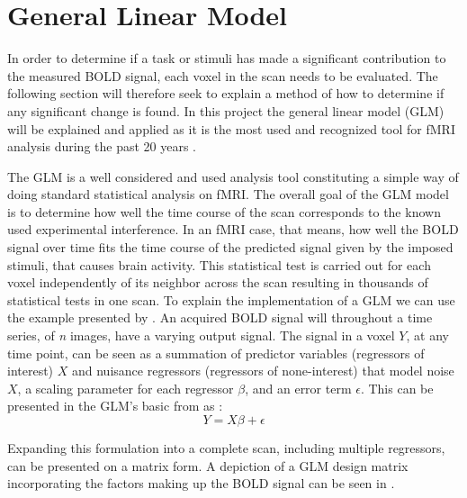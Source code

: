 \section{General Linear Model} \label{back:sec:glm}

In order to determine if a task or stimuli has made a significant contribution to the measured BOLD signal, each voxel in the scan needs to be evaluated. The following section will therefore seek to explain a method of how to determine if any significant change is found. In this project the general linear model (GLM) will be explained and applied as it is the most used and recognized tool for fMRI analysis during the past 20 years \cite{Poline2012}. 

The GLM is a well considered and used analysis tool constituting a simple way of doing standard statistical analysis on fMRI. The overall goal of the GLM model is to determine how well the time course of the scan corresponds to the known used experimental interference.  In an fMRI case, that means, how well the BOLD signal over time fits the time course of the predicted signal given by the imposed stimuli, that causes brain activity. This statistical test is carried out for each voxel independently of its neighbor across the scan resulting in thousands of statistical tests in one scan. \cite{Moayedi2018,Monti2011} To explain the implementation of a GLM we can use the example presented by \cite{Monti2011}. An acquired BOLD signal will throughout a time series, of \textit{n} images, have a varying output signal. The signal in a voxel $Y$, at any time point, can be seen as a summation of predictor variables (regressors of interest) $X$ and nuisance regressors (regressors of none-interest) that model noise $X$, a scaling parameter for each regressor $\beta$, and an error term $\epsilon$. This can be presented in the GLM's basic from as \cite{Monti2011}: 
\begin{equation}
Y=X\beta+\epsilon
\end{equation}

Expanding this formulation into a complete scan, including multiple regressors, can be presented on a matrix form. A depiction of a GLM design matrix incorporating the factors making up the BOLD signal can be seen in . 

